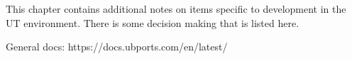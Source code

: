 \label{ch:shared}

This chapter contains additional notes on items specific to development in the UT environment. There is some decision making that is listed here.


General docs:
https://docs.ubports.com/en/latest/






